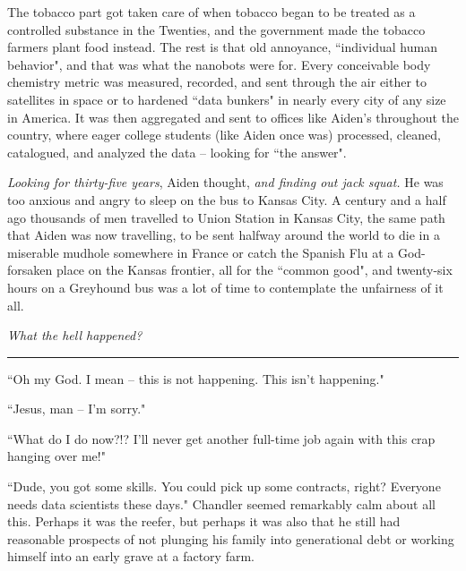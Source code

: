 \documentclass[11pt]{book}
\begin{document}
	The tobacco part got taken care of when tobacco began to be treated as a controlled substance in the Twenties, and the government made the tobacco farmers plant food instead. The rest is that old annoyance, ``individual human behavior", and that was what the nanobots were for. Every conceivable body chemistry metric was measured, recorded, and sent through the air either to satellites in space or to hardened ``data bunkers" in nearly every city of any size in America. It was then aggregated and sent to offices like Aiden's throughout the country, where eager college students (like Aiden once was) processed, cleaned, catalogued, and analyzed the data -- looking for ``the answer".
	
	\textit{Looking for thirty-five years}, Aiden thought, \textit{and finding out jack squat.} He was too anxious and angry to sleep on the bus to Kansas City. A century and a half ago thousands of men travelled to Union Station in Kansas City, the same path that Aiden was now travelling, to be sent halfway around the world to die in a miserable mudhole somewhere in France or catch the Spanish Flu at a God-forsaken place on the Kansas frontier, all for the ``common good", and twenty-six hours on a Greyhound bus was a lot of time to contemplate the unfairness of it all.
	
	\textit{What the hell happened?}
	
	\vspace{0.5cm}
	\hrule
	\vspace{0.5cm}
	
	``Oh my God. I mean -- this is not happening. This isn't happening." 
	
	``Jesus, man -- I'm sorry."
	
	``What do I do now?!? I'll never get another full-time job again with this crap hanging over me!"
	
	``Dude, you got some skills. You could pick up some contracts, right? Everyone needs data scientists these days." Chandler seemed remarkably calm about all this. Perhaps it was the reefer, but perhaps it was also that he still had reasonable prospects of not plunging his family into generational debt or working himself into an early grave at a factory farm.
	
\end{document}
